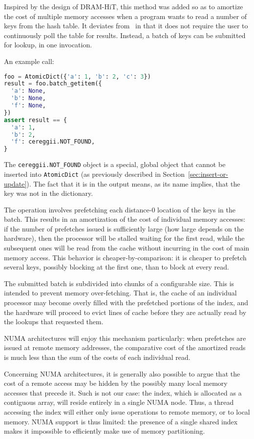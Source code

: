 Inspired by the design of DRAM-HiT, this method was added so as to amortize the cost of multiple memory accesses when a program wants to read a number of keys from the hash table.
It deviates from~\cite{dramhit} in that it does not require the user to continuously poll the table for results.
Instead, a batch of keys can be submitted for lookup, in one invocation.

An example call:

\begin{lstlisting}[language=Python,label={lst:batch-lookup-usage}]
foo = AtomicDict({'a': 1, 'b': 2, 'c': 3})
result = foo.batch_getitem({
  'a': None,
  'b': None,
  'f': None,
})
assert result == {
  'a': 1,
  'b': 2,
  'f': cereggii.NOT_FOUND,
}
\end{lstlisting}

The \texttt{cereggii.NOT\_FOUND} object is a special, global object that cannot be inserted into \texttt{AtomicDict} (as previously described in Section~\ref{sec:insert-or-update}).
The fact that it is in the output means, as its name implies, that the key was not in the dictionary.

The operation involves prefetching each distance-0 location of the keys in the batch.
This results in an amortization of the cost of individual memory accesses: if the number of prefetches issued is sufficiently large (how large depends on the hardware), then the processor will be stalled waiting for the first read, while the subsequent ones will be read from the cache without incurring in the cost of main memory access.
This behavior is cheaper-by-comparison: it is cheaper to prefetch several keys, possibly blocking at the first one, than to block at every read.

The submitted batch is subdivided into chunks of a configurable size.
This is intended to prevent memory over-fetching.
That is, the cache of an individual processor may become overly filled with the prefetched portions of the index, and the hardware will proceed to evict lines of cache before they are actually read by the lookups that requested them.

NUMA architectures will enjoy this mechanism particularly: when prefetches are issued at remote memory addresses, the comparative cost of the amortized reads is much less than the sum of the costs of each individual read.

Concerning NUMA architectures, it is generally also possible to argue that the cost of a remote access may be hidden by the possibly many local memory accesses that precede it.
Such is not our case: the index, which is allocated as a contiguous array, will reside entirely in a single NUMA node.
Thus, a thread accessing the index will either only issue operations to remote memory, or to local memory.
NUMA support is thus limited: the presence of a single shared index makes it impossible to efficiently make use of memory partitioning.

